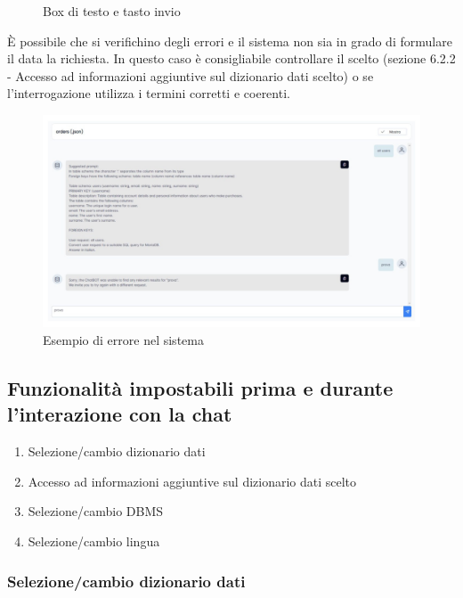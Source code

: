 \begin{figure}[H]
  \centering
  \caption{Box di testo e tasto invio}
\end{figure}

È possibile che si verifichino degli errori e il sistema non sia in grado di formulare il  data la richiesta. In questo caso è consigliabile controllare il  scelto (sezione 6.2.2 - Accesso ad informazioni aggiuntive sul dizionario dati scelto) o se l'interrogazione utilizza i termini corretti e coerenti.

\begin{figure}[H]
  \centering
  \includegraphics[width=1\textwidth]{assets/es_chat_errore.png}
  \caption{Esempio di errore nel sistema}
\end{figure}

\subsection{Funzionalità impostabili prima e durante l'interazione con la chat}

\begin{enumerate}
  \item Selezione/cambio dizionario dati
  \item Accesso ad informazioni aggiuntive sul dizionario dati scelto
  \item Selezione/cambio DBMS
  \item Selezione/cambio lingua
\end{enumerate}

\subsubsection{Selezione/cambio dizionario dati}

